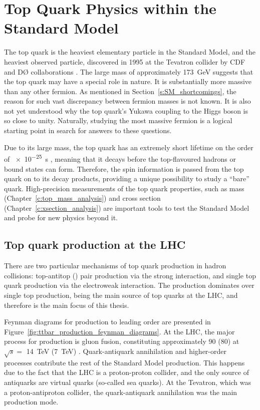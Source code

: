 \newpage
\section{Top Quark Physics within the Standard Model}
\label{s:top_quak_physics}
The top quark is the heaviest elementary particle in the Standard Model, and the heaviest observed particle, discovered
in 1995 at the Tevatron collider by CDF and D{\O} collaborations \autocite{CDF_top_observation, D0_top_observation}. The
large mass of approximately \SI{173}{\GeV} suggests that the top quark may have a special role in nature. It is
substantially more massive than any other fermion. As mentioned in Section~\ref{s:SM_shortcomings}, the reason for such
vast discrepancy between fermion masses is not known. It is also not yet understood why the top quark's Yukawa coupling
to the Higgs boson is so close to unity. Naturally, studying the most massive fermion is a logical starting point in
search for answers to these questions.

Due to its large mass, the top quark has an extremely short lifetime on the order of \SI{e-25}{\s} \autocite{PDG},
meaning that it decays before the top-flavoured hadrons or \ttbar bound states can form. Therefore, the spin information
is passed from the top quark on to its decay products, providing a unique possibility to study a ``bare'' quark.
High-precision measurements of the top quark properties, such as mass (Chapter~\ref{c:top_mass_analysis}) and cross
section (Chapter~\ref{c:xsection_analysis}) are important tools to test the Standard Model and probe for new physics
beyond it.

\subsection{Top quark production at the LHC}
\label{ss:top_production}
There are two particular mechanisms of top quark production in hadron collisions: top-antitop (\ttbar) pair production
via the strong interaction, and single top quark production via the electroweak interaction. The \ttbar production
dominates over single top production, being the main source of top quarks at the LHC, and therefore is the main focus of
this thesis.

Feynman diagrams for \ttbar production to leading order are presented in
Figure~\ref{fig:ttbar_production_feynman_diagrams}. At the LHC, the major process for \ttbar production is gluon fusion,
constituting approximately \SI{90}{\pc} (\SI{80}{\pc}) at $\sqrt s =$ \SI{14}{\TeV} (\SI{7}{\TeV}) \autocite{PDG}.
Quark-antiquark annihilation and higher-order processes contribute the rest of the Standard Model \ttbar production.
This happens due to the fact that the LHC is a proton-proton collider, and the only source of antiquarks are virtual
quarks (so-called sea quarks). At the Tevatron, which was a proton-antiproton collider, the quark-antiquark annihilation
was the main \ttbar production mode.

